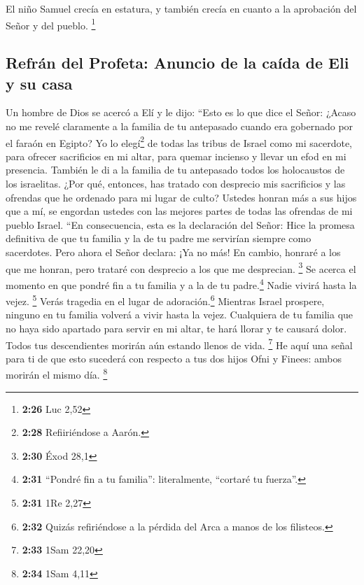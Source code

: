  El niño Samuel crecía en estatura, y también crecía en
cuanto a la aprobación del Señor y del pueblo. \footnote{\textbf{2:26}
  Luc 2,52}

\hypertarget{refruxe1n-del-profeta-anuncio-de-la-cauxedda-de-eli-y-su-casa}{%
\subsection{Refrán del Profeta: Anuncio de la caída de Eli y su
casa}\label{refruxe1n-del-profeta-anuncio-de-la-cauxedda-de-eli-y-su-casa}}

 Un hombre de Dios se acercó a Elí y le dijo: ``Esto es
lo que dice el Señor: ¿Acaso no me revelé claramente a la familia de tu
antepasado cuando era gobernado por el faraón en Egipto? 
Yo lo elegí\footnote{\textbf{2:28} Refiiriéndose a Aarón.} de todas las
tribus de Israel como mi sacerdote, para ofrecer sacrificios en mi
altar, para quemar incienso y llevar un efod en mi presencia. También le
di a la familia de tu antepasado todos los holocaustos de los
israelitas.  ¿Por qué, entonces, has tratado con
desprecio mis sacrificios y las ofrendas que he ordenado para mi lugar
de culto? Ustedes honran más a sus hijos que a mí, se engordan ustedes
con las mejores partes de todas las ofrendas de mi pueblo Israel.
 ``En consecuencia, esta es la declaración del Señor:
Hice la promesa definitiva de que tu familia y la de tu padre me
servirían siempre como sacerdotes. Pero ahora el Señor declara: ¡Ya no
más! En cambio, honraré a los que me honran, pero trataré con desprecio
a los que me desprecian. \footnote{\textbf{2:30} Éxod 28,1}
 Se acerca el momento en que pondré fin a tu familia y a
la de tu padre.\footnote{\textbf{2:31} ``Pondré fin a tu familia'':
  literalmente, ``cortaré tu fuerza''.} Nadie vivirá hasta la vejez.
\footnote{\textbf{2:31} 1Re 2,27}  Verás tragedia en el
lugar de adoración.\footnote{\textbf{2:32} Quizás refiriéndose a la
  pérdida del Arca a manos de los filisteos.} Mientras Israel prospere,
ninguno en tu familia volverá a vivir hasta la vejez. 
Cualquiera de tu familia que no haya sido apartado para servir en mi
altar, te hará llorar y te causará dolor. Todos tus descendientes
morirán aún estando llenos de vida. \footnote{\textbf{2:33} 1Sam 22,20}
 He aquí una señal para ti de que esto sucederá con
respecto a tus dos hijos Ofni y Finees: ambos morirán el mismo día.
\footnote{\textbf{2:34} 1Sam 4,11}

